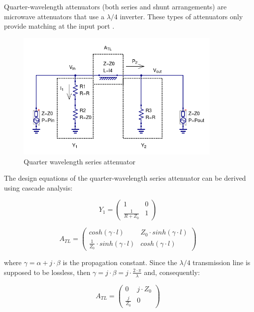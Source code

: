 \noindent Quarter-wavelength attenuators (both series and shunt arrangements) are microwave attenuators that use a $\lambda/4$ inverter. These types of attenuators only provide matching at the input port \cite{pin_diode_designer_handbook}.

  \begin{figure}[ht]
    \centering
    \includegraphics[width=10cm]{./images/qw-series-attenuator-schematic.png}
    \caption{Quarter wavelength series attenuator}
    \label{fig:qw-series-attenuator-schematic}
  \end{figure}

\noindent The design equations of the quarter-wavelength series attenuator can be derived using cascade analysis:

\begin{equation}
	Y_1 = \begin{pmatrix}
				1 & 0\\
				\frac{1}{R + Z_0} & 1
		  \end{pmatrix}
\end{equation}

\begin{equation}
	A_{TL} = \begin{pmatrix}
				cosh(\gamma \cdot l) & Z_0 \cdot sinh(\gamma \cdot l)\\
				\frac{1}{Z_0} \cdot sinh(\gamma \cdot l)  & cosh(\gamma \cdot l)
		     \end{pmatrix}
\end{equation}

\noindent where $\gamma = \alpha + j \cdot \beta$ is the propagation constant. Since the $\lambda/4$ transmission line is supposed to be lossless, then $\gamma = j \cdot \beta = j \cdot \frac{2 \cdot \pi}{\lambda}$ and, consequently:

\begin{equation}
	A_{TL} = \begin{pmatrix}
				0 & j \cdot Z_0\\
				\frac{j}{Z_0}  & 0
		     \end{pmatrix}
\end{equation}

